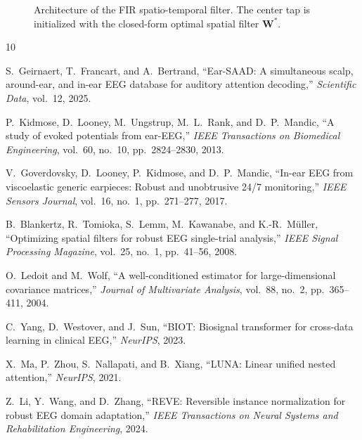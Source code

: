 \documentclass[conference]{IEEEtran}
\begin{document}
\begin{figure}[t]
    \centering
    \caption{Architecture of the FIR spatio-temporal filter. The center tap is initialized with the closed-form optimal spatial filter $\mathbf{W}^*$.}
    \label{fig:architecture}
\end{figure}



\begin{thebibliography}{10}

S.~Geirnaert, T.~Francart, and A.~Bertrand,
``{Ear-SAAD}: A simultaneous scalp, around-ear, and in-ear {EEG} database for auditory attention decoding,''
\emph{Scientific Data}, vol.~12, 2025.

P.~Kidmose, D.~Looney, M.~Ungstrup, M.~L.~Rank, and D.~P.~Mandic,
``A study of evoked potentials from ear-{EEG},''
\emph{IEEE Transactions on Biomedical Engineering}, vol.~60, no.~10, pp.~2824--2830, 2013.

V.~Goverdovsky, D.~Looney, P.~Kidmose, and D.~P.~Mandic,
``In-ear {EEG} from viscoelastic generic earpieces: Robust and unobtrusive 24/7 monitoring,''
\emph{IEEE Sensors Journal}, vol.~16, no.~1, pp.~271--277, 2017.

B.~Blankertz, R.~Tomioka, S.~Lemm, M.~Kawanabe, and K.-R.~M\"{u}ller,
``Optimizing spatial filters for robust {EEG} single-trial analysis,''
\emph{IEEE Signal Processing Magazine}, vol.~25, no.~1, pp.~41--56, 2008.

O.~Ledoit and M.~Wolf,
``A well-conditioned estimator for large-dimensional covariance matrices,''
\emph{Journal of Multivariate Analysis}, vol.~88, no.~2, pp.~365--411, 2004.

C.~Yang, D.~Westover, and J.~Sun,
``{BIOT}: Biosignal transformer for cross-data learning in clinical {EEG},''
\emph{NeurIPS}, 2023.

X.~Ma, P.~Zhou, S.~Nallapati, and B.~Xiang,
``{LUNA}: Linear unified nested attention,''
\emph{NeurIPS}, 2021.

Z.~Li, Y.~Wang, and D.~Zhang,
``{REVE}: Reversible instance normalization for robust {EEG} domain adaptation,''
\emph{IEEE Transactions on Neural Systems and Rehabilitation Engineering}, 2024.


\end{thebibliography}
\end{document}
